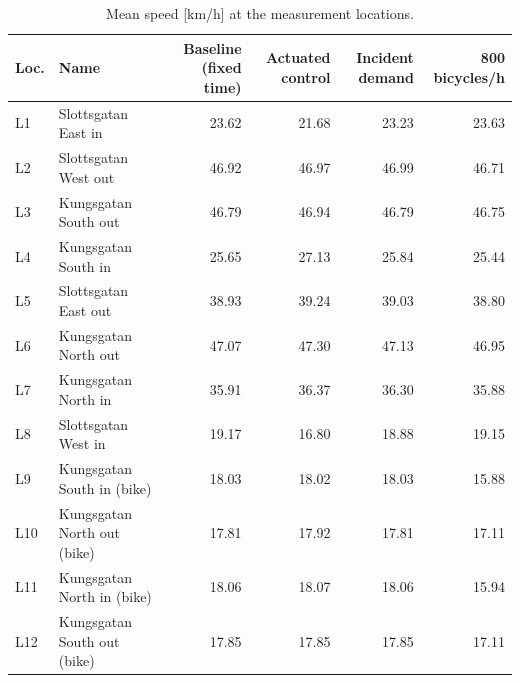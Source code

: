 \begin{table}[H]
\centering
\caption{Mean speed [km/h] at the measurement locations.}
\label{tab:altspeed}
\small
\begin{tabular}{llrrrr}
\toprule
\textbf{Loc.} & \textbf{Name} & \textbf{Baseline (fixed time)} & \textbf{Actuated control} & \textbf{Incident demand} & \textbf{800 bicycles/h}\\
\midrule
L1 & Slottsgatan East in & 23.62 & 21.68 & 23.23 & 23.63\\
L2 & Slottsgatan West out & 46.92 & 46.97 & 46.99 & 46.71\\
L3 & Kungsgatan South out & 46.79 & 46.94 & 46.79 & 46.75\\
L4 & Kungsgatan South in & 25.65 & 27.13 & 25.84 & 25.44\\
L5 & Slottsgatan East out & 38.93 & 39.24 & 39.03 & 38.80\\
L6 & Kungsgatan North out & 47.07 & 47.30 & 47.13 & 46.95\\
L7 & Kungsgatan North in & 35.91 & 36.37 & 36.30 & 35.88\\
L8 & Slottsgatan West in & 19.17 & 16.80 & 18.88 & 19.15\\
L9 & Kungsgatan South in (bike) & 18.03 & 18.02 & 18.03 & 15.88\\
L10 & Kungsgatan North out (bike) & 17.81 & 17.92 & 17.81 & 17.11\\
L11 & Kungsgatan North in (bike) & 18.06 & 18.07 & 18.06 & 15.94\\
L12 & Kungsgatan South out (bike) & 17.85 & 17.85 & 17.85 & 17.11\\
\bottomrule
\end{tabular}
\end{table}